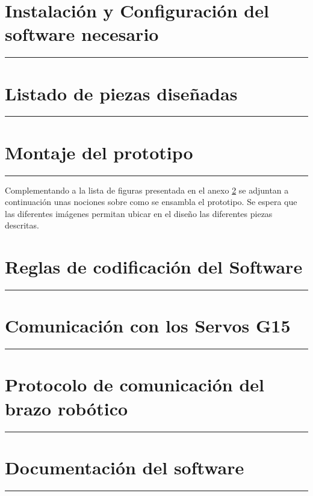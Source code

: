 \appendix
{}


	\chapter{Instalación y Configuración del software necesario} \label{app:instalacion_software}
		\hrule
		\vspace{3mm}
		
	
	\chapter{Listado de piezas diseñadas} \label{app:listadoPiezas}
		\hrule
		\vspace{3mm}
		
	
	\chapter{Montaje del prototipo} \label{app:montajePiezas}
		\hrule
		\vspace{3mm}
		Complementando a la lista de figuras presentada en el anexo \ref{app:listadoPiezas} se adjuntan a continuación unas nociones sobre como se ensambla el prototipo. Se espera que las diferentes imágenes permitan ubicar en el diseño las diferentes piezas descritas.
		
		\begin{landscape}
		    	
		\end{landscape}
	
	\chapter{Reglas de codificación del Software} \label{app:codificacionSW}
		\hrule
		\vspace{3mm}
		
	
	
	\chapter{Comunicación con los Servos G15} \label{app:registros_g15}
		\hrule
		\vspace{3mm}
		
	
	\chapter{Protocolo de comunicación del brazo robótico} \label{app:comunicacion_brazo}
		\hrule
		\vspace{3mm}
		
	
	\chapter{Documentación del software} \label{app:documentacion_software}
		\hrule
		\vspace{3mm}
		




